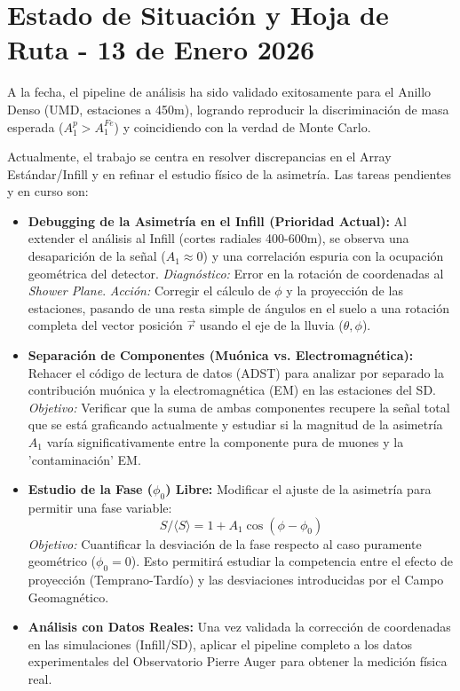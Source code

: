 \section*{Estado de Situación y Hoja de Ruta - 13 de Enero 2026}

A la fecha, el pipeline de análisis ha sido validado exitosamente para el Anillo Denso (UMD, estaciones a 450m), logrando reproducir la discriminación de masa esperada ($A_1^p > A_1^{Fe}$) y coincidiendo con la verdad de Monte Carlo. 

Actualmente, el trabajo se centra en resolver discrepancias en el Array Estándar/Infill y en refinar el estudio físico de la asimetría. Las tareas pendientes y en curso son:

\begin{itemize}
	\item \textbf{Debugging de la Asimetría en el Infill (Prioridad Actual):} 
	Al extender el análisis al Infill (cortes radiales 400-600m), se observa una desaparición de la señal ($A_1 \approx 0$) y una correlación espuria con la ocupación geométrica del detector. 
	\textit{Diagnóstico:} Error en la rotación de coordenadas al \textit{Shower Plane}.
	\textit{Acción:} Corregir el cálculo de $\phi$ y la proyección de las estaciones, pasando de una resta simple de ángulos en el suelo a una rotación completa del vector posición $\vec{r}$ usando el eje de la lluvia ($\theta, \phi$).
	
	\item \textbf{Separación de Componentes (Muónica vs. Electromagnética):}
	Rehacer el código de lectura de datos (ADST) para analizar por separado la contribución muónica y la electromagnética (EM) en las estaciones del SD.
	\textit{Objetivo:} Verificar que la suma de ambas componentes recupere la señal total que se está graficando actualmente y estudiar si la magnitud de la asimetría $A_1$ varía significativamente entre la componente pura de muones y la 'contaminación' EM.
	
	\item \textbf{Estudio de la Fase ($\phi_0$) Libre:}
	Modificar el ajuste de la asimetría para permitir una fase variable: 
	$$S / \langle S \rangle = 1 + A_1 \cos(\phi - \phi_0)$$
	\textit{Objetivo:} Cuantificar la desviación de la fase respecto al caso puramente geométrico ($\phi_0 = 0$). Esto permitirá estudiar la competencia entre el efecto de proyección (Temprano-Tardío) y las desviaciones introducidas por el Campo Geomagnético.
	
	\item \textbf{Análisis con Datos Reales:}
	Una vez validada la corrección de coordenadas en las simulaciones (Infill/SD), aplicar el pipeline completo a los datos experimentales del Observatorio Pierre Auger para obtener la medición física real.
\end{itemize}\\

